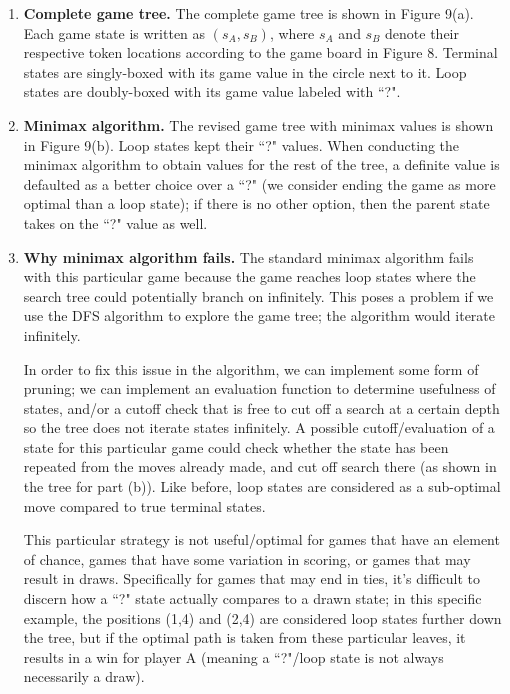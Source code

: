 \documentclass[12pt]{article}
\begin{document}
\begin{enumerate}[label=(\alph*)]
    \item \textbf{Complete game tree.} The complete game tree is shown in Figure 9(a). Each game state is written as $(s_A, s_B)$, where $s_A$ and $s_B$ denote their respective token locations according to the game board in Figure 8. Terminal states are singly-boxed with its game value in the circle next to it. Loop states are doubly-boxed with its game value labeled with ``?".

    \item \textbf{Minimax algorithm.} The revised game tree with minimax values is shown in Figure 9(b). Loop states kept their ``?" values. When conducting the minimax algorithm to obtain values for the rest of the tree, a definite value is defaulted as a better choice over a ``?" (we consider ending the game as more optimal than a loop state); if there is no other option, then the parent state takes on the ``?" value as well. 

    \item \textbf{Why minimax algorithm fails.} The standard minimax algorithm fails with this particular game because the game reaches loop states where the search tree could potentially branch on infinitely. This poses a problem if we use the DFS algorithm to explore the game tree; the algorithm would iterate infinitely. 
    
    In order to fix this issue in the algorithm, we can implement some form of pruning; we can implement an evaluation function to determine usefulness of states, and/or a cutoff check that is free to cut off a search at a certain depth so the tree does not iterate states infinitely. A possible cutoff/evaluation of a state for this particular game could check whether the state has been repeated from the moves already made, and cut off search there (as shown in the tree for part (b)). Like before, loop states are considered as a sub-optimal move compared to true terminal states.

    This particular strategy is not useful/optimal for games that have an element of chance, games that have some variation in scoring, or games that may result in draws.  Specifically for games that may end in ties, it's difficult to discern how a ``?" state actually compares to a drawn state; in this specific example, the positions (1,4) and (2,4) are considered loop states further down the tree, but if the optimal path is taken from these particular leaves, it results in a win for player A (meaning a ``?"/loop state is not always necessarily a draw). 


\end{enumerate}
\end{document}
